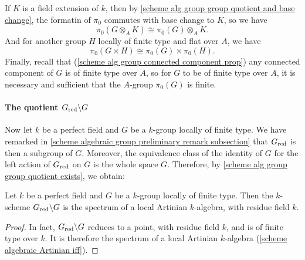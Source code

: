 If $K$ is a field extension of $k$, then by \cref{scheme alg group group quotient and base change}, the formatin of $\pi_0$ commutes with base change to $K$, so we have
\[\pi_0(G\otimes_AK)\cong\pi_0(G)\otimes_AK.\]
And for another group $H$ locally of finite type and flat over $A$, we have
\[\pi_0(G\times H)\cong\pi_0(G)\times\pi_0(H).\]
Finally, recall that (\cref{scheme alg group connected component prop}) any connected component of $G$ is of finite type over $A$, so for $G$ to be of finite type over $A$, it is necessary and sufficient that the $A$-group $\pi_0(G)$ is finite.

\paragraph{The quotient \texorpdfstring{$G_{\mathrm{red}}\backslash G$}{G}}
Now let $k$ be a perfect field and $G$ be a $k$-group locally of finite type. We have remarked in \autoref{scheme algebraic group preliminary remark subsection} that $G_{\mathrm{red}}$ is then a subgroup of $G$. Moreover, the equivalence class of the identity of $G$ for the left action of $G_{\mathrm{red}}$ on $G$ is the whole space $G$. Therefore, by \cref{scheme alg group group quotient exists}, we obtain:

\begin{proposition}\label{scheme alg group over perfect G/G_red char}
Let $k$ be a perfect field and $G$ be a $k$-group locally of finite type. Then the $k$-scheme $G_{\mathrm{red}}\backslash G$ is the spectrum of a local Artinian $k$-algebra, with residue field $k$.
\end{proposition}
\begin{proof}
In fact, $G_{\mathrm{red}}\backslash G$ reduces to a point, with residue field $k$, and is of finite type over $k$. It is therefore the spectrum of a local Artinian $k$-algebra (\cref{scheme algebraic Artinian iff}).
\end{proof}

